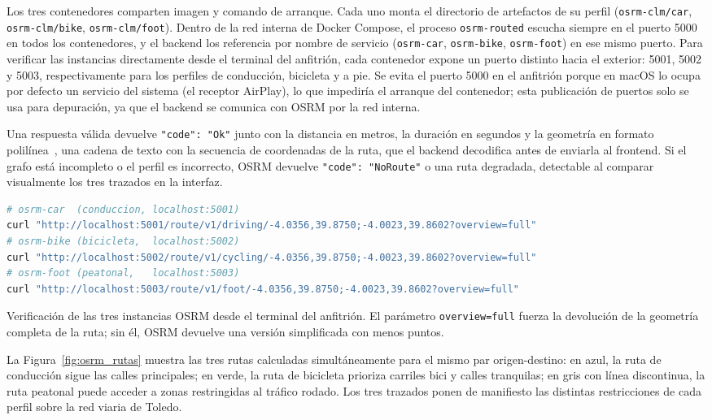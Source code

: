 Los tres contenedores comparten imagen y comando de arranque. Cada uno monta el directorio de artefactos de su perfil (\texttt{osrm-clm/car}, \texttt{osrm-clm/bike}, \texttt{osrm-clm/foot}). Dentro de la red interna de Docker Compose, el proceso \texttt{osrm-routed} escucha siempre en el puerto 5000 en todos los contenedores, y el backend los referencia por nombre de servicio (\texttt{osrm-car}, \texttt{osrm-bike}, \texttt{osrm-foot}) en ese mismo puerto. Para verificar las instancias directamente desde el terminal del anfitrión, cada contenedor expone un puerto distinto hacia el exterior: 5001, 5002 y 5003, respectivamente para los perfiles de conducción, bicicleta y a pie. Se evita el puerto 5000 en el anfitrión porque en macOS lo ocupa por defecto un servicio del sistema (el receptor AirPlay), lo que impediría el arranque del contenedor; esta publicación de puertos solo se usa para depuración, ya que el backend se comunica con OSRM por la red interna.


Una respuesta válida devuelve \texttt{"code": "Ok"} junto con la distancia en metros, la duración en segundos y la geometría en formato polilínea~\cite{GooglePolyline}, una cadena de texto con la secuencia de coordenadas de la ruta, que el backend decodifica antes de enviarla al frontend. Si el grafo está incompleto o el perfil es incorrecto, OSRM devuelve \texttt{"code": "NoRoute"} o una ruta degradada, detectable al comparar visualmente los tres trazados en la interfaz.

\begin{code}[H]
\begin{lstlisting}[language=bash]
# osrm-car  (conduccion, localhost:5001)
curl "http://localhost:5001/route/v1/driving/-4.0356,39.8750;-4.0023,39.8602?overview=full"
# osrm-bike (bicicleta,  localhost:5002)
curl "http://localhost:5002/route/v1/cycling/-4.0356,39.8750;-4.0023,39.8602?overview=full"
# osrm-foot (peatonal,   localhost:5003)
curl "http://localhost:5003/route/v1/foot/-4.0356,39.8750;-4.0023,39.8602?overview=full"
\end{lstlisting}
\caption{Verificación de las tres instancias OSRM desde el terminal del anfitrión. El parámetro \texttt{overview=full} fuerza la devolución de la geometría completa de la ruta; sin él, OSRM devuelve una versión simplificada con menos puntos.}
\label{cod:osrm_verificacion}
\end{code}

La Figura~\ref{fig:osrm_rutas} muestra las tres rutas calculadas simultáneamente para el mismo par origen-destino: en azul, la ruta de conducción sigue las calles principales; en verde, la ruta de bicicleta prioriza carriles bici y calles tranquilas; en gris con línea discontinua, la ruta peatonal puede acceder a zonas restringidas al tráfico rodado. Los tres trazados ponen de manifiesto las distintas restricciones de cada perfil sobre la red viaria de Toledo.

